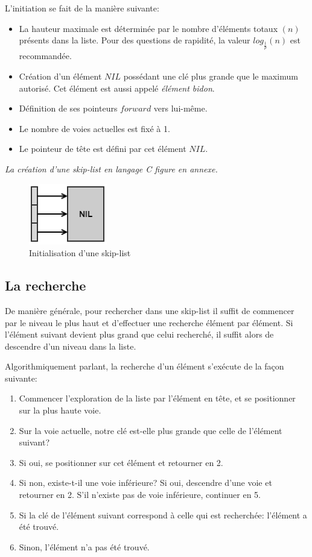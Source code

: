 \documentclass[hidelinks,a4paper, 12pt]{article}
\begin{document}
	L'initiation se fait de la manière suivante:
	\begin{itemize}
		\item La hauteur maximale est déterminée par le nombre d'éléments totaux $(n)$ présents dans la liste. Pour des questions de rapidité, la valeur $log_\frac{1}{p}(n)$ est recommandée.
		\item Création d'un élément $NIL$ possédant une clé plus grande que le maximum autorisé. Cet élément est aussi appelé \textit{élément bidon}.
		\item Définition de ses pointeurs $forward$ vers lui-même.
		\item Le nombre de voies actuelles est fixé à 1.
		\item Le pointeur de tête est défini par cet élément $NIL$.
	\end{itemize}
	\emph{La création d'une skip-list en langage C figure en annexe.}
	
	\begin{figure}[h]
		\includegraphics[scale=0.95]{img/init}
		\caption{Initialisation d'une skip-list}
		\label{SkipInit}
	\end{figure}
	
	\newpage
	\subsection{La recherche}
	De manière générale, pour rechercher dans une skip-list il suffit de commencer par le niveau le plus haut et d'effectuer une recherche élément par élément. Si l'élément suivant devient plus grand que celui recherché, il suffit alors de descendre d'un niveau dans la liste.
	
	Algorithmiquement parlant, la recherche d'un élément s'exécute de la façon suivante:
	\begin{enumerate}
		\item Commencer l'exploration de la liste par l'élément en tête, et se positionner sur la plus haute voie.
		\item Sur la voie actuelle, notre clé est-elle plus grande que celle de l'élément suivant?
		\item Si oui, se positionner sur cet élément et retourner en 2.
		\item Si non, existe-t-il une voie inférieure?
		\subitem Si oui, descendre d'une voie et retourner en 2. 
		\subitem S'il n'existe pas de voie inférieure, continuer en 5.
		\subitem
		\item Si la clé de l'élément suivant correspond à celle qui est recherchée: l'élément a été trouvé.
		\item Sinon, l'élément n'a pas été trouvé.
	\end{enumerate}
	
\end{document}

